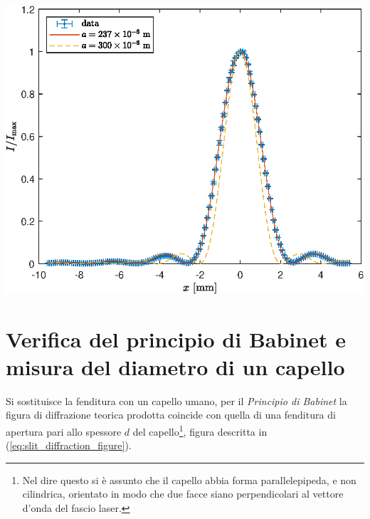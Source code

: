 \documentclass[10pt,oneside,a4paper]{article}
\newenvironment{Figure}
  {\par\medskip\noindent\minipage{\linewidth}}
  {\endminipage\par\medskip}
\begin{document}
\begin{multicols}{2}
\begin{Figure}
	\begin{center}
	\includegraphics[width=\linewidth]{figura_diffrazione.eps}
	\label{fig:I}
	\end{center}
\end{Figure}


\section{Verifica del principio di Babinet e misura del diametro di un capello}
Si sostituisce la fenditura con un capello umano, per il \emph{Principio di Babinet} la figura di diffrazione teorica prodotta coincide con quella di una fenditura di apertura pari allo spessore $d$ del capello\footnote{Nel dire questo si è assunto che il capello abbia forma parallelepipeda, e non cilindrica, orientato in modo che due facce siano perpendicolari al vettore d'onda del fascio laser.}, figura descritta in (\ref{eq:slit_diffraction_figure}). 


\end{multicols}
\end{document}
